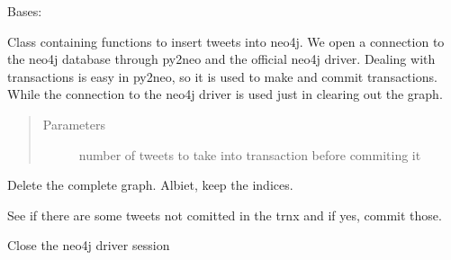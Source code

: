 \documentclass[letterpaper,10pt,english]{sphinxmanual}
\begin{document}
\begin{fulllineitems}
\label{\detokenize{neo4j_data_ingestion:ingest_neo4j_streaming.Twitter}}
Bases: 

Class containing functions to insert tweets into neo4j.
We open a connection to the neo4j database through py2neo and the official
neo4j driver. Dealing with transactions is easy in py2neo, so it is used to make and commit transactions. While
the connection to the neo4j driver is used just in clearing out the graph.
\begin{quote}\begin{description}
\item[{Parameters}] \leavevmode
{} \textendash{} number of tweets to take into transaction before commiting it

\end{description}\end{quote}

\begin{fulllineitems}
\label{\detokenize{neo4j_data_ingestion:ingest_neo4j_streaming.Twitter.clear_graph}}
Delete the complete graph. Albiet, keep the indices.

\end{fulllineitems}


\begin{fulllineitems}
\label{\detokenize{neo4j_data_ingestion:ingest_neo4j_streaming.Twitter.close}}
See if there are some tweets not comitted in the trnx and if yes, commit those.

\end{fulllineitems}


\begin{fulllineitems}
\label{\detokenize{neo4j_data_ingestion:ingest_neo4j_streaming.Twitter.close_session}}
Close the neo4j driver session

\end{fulllineitems}


\end{fulllineitems}
\end{document}
